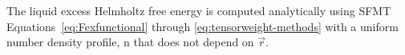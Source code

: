 \documentclass[double,12pt]{beavtex}
\begin{document}
%
The liquid excess Helmholtz free energy is computed analytically  
using SFMT Equations~\ref{eq:Fexfunctional} through \ref{eq:tensorweight-methods} 
with a uniform number density profile, n that does not depend on $\vec r$. 
\end{document}
